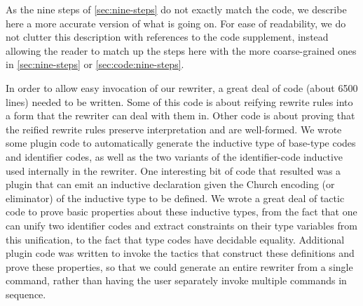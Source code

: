 \documentclass[a4paper,USenglish,cleveref,autoref,thm-restate]{lipics-v2021}
\begin{document}
As the nine steps of \autoref{sec:nine-steps} do not exactly match the code, we describe here a more accurate version of what is going on.
For ease of readability, we do not clutter this description with references to the code supplement, instead allowing the reader to match up the steps here with the more coarse-grained ones in \autoref{sec:nine-steps} or \autoref{sec:code:nine-steps}.

In order to allow easy invocation of our rewriter, a great deal of code (about 6500 lines) needed to be written.
Some of this code is about reifying rewrite rules into a form that the rewriter can deal with them in.
Other code is about proving that the reified rewrite rules preserve interpretation and are well-formed.
We wrote some plugin code to automatically generate the inductive type of base-type codes and identifier codes, as well as the two variants of the identifier-code inductive used internally in the rewriter.
One interesting bit of code that resulted was a plugin that can emit an inductive declaration given the Church encoding (or eliminator) of the inductive type to be defined.
We wrote a great deal of tactic code to prove basic properties about these inductive types, from the fact that one can unify two identifier codes and extract constraints on their type variables from this unification, to the fact that type codes have decidable equality.
Additional plugin code was written to invoke the tactics that construct these definitions and prove these properties, so that we could generate an entire rewriter from a single command, rather than having the user separately invoke multiple commands in sequence.
\end{document}
